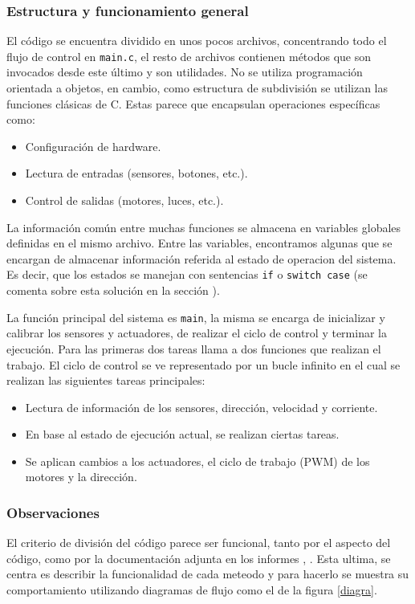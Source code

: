 \subsubsection*{Estructura y funcionamiento general}

El código se encuentra dividido en unos pocos archivos, concentrando todo el flujo de control en \verb|main.c|, el resto de archivos contienen métodos que son invocados desde este último y son utilidades. No se utiliza programación orientada a objetos, en cambio, como estructura de subdivisión se utilizan las funciones clásicas de C. Estas parece que encapsulan operaciones específicas como:
\begin{itemize}
\item Configuración de hardware.
\item Lectura de entradas (sensores, botones, etc.).
\item Control de salidas (motores, luces, etc.).
\end{itemize}

La información común entre muchas funciones se almacena en variables globales definidas en el mismo archivo. Entre las variables, encontramos algunas que se encargan de almacenar información referida al estado de operacion del sistema. Es decir, que los estados se manejan con sentencias \verb|if| o \verb|switch case| (se comenta sobre esta solución en la sección ).

La función principal del sistema es \verb|main|, la misma se encarga de inicializar y calibrar los sensores y actuadores, de realizar el ciclo de control y terminar la ejecución. Para las primeras dos tareas llama a dos funciones que realizan el trabajo. El ciclo de control se ve representado por un bucle infinito en el cual se realizan las siguientes tareas principales:
\begin{itemize}
\item Lectura de información de los sensores, dirección, velocidad y corriente.
\item En base al estado de ejecución actual, se realizan ciertas tareas.
\item Se aplican cambios a los actuadores, el ciclo de trabajo (\gls{PWM}) de los motores y la dirección.
\end{itemize}

\subsubsection*{Observaciones}
El criterio de división del código parece ser funcional, tanto por el aspecto del código, como por la documentación adjunta en los informes \cite[pág. 78-85]{disenioViejo1}, \cite[pág. 110-149]{disenioViejo2}. Esta ultima, se centra es describir la funcionalidad de cada meteodo y para hacerlo se muestra su comportamiento utilizando diagramas de flujo como el de la figura \ref{diagra}. 

